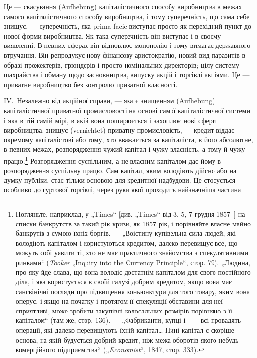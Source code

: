Це — скасування (Aufhebung) капіталістичного способу виробництва
в межах самого капіталістичного способу виробництва,
і тому суперечність, що сама себе знищує, — суперечність, яка
prima facie виступає просто як перехідний пункт до нової
форми виробництва. Як така суперечність він виступає і в
своєму виявленні. В певних сферах він відновлює монополію і
тому вимагає державного втручання. Він репродукує нову фінансову аристократію, новий вид паразитів в
образі прожектерів,
грюндерів і просто номінальних директорів; цілу систему шахрайства і обману щодо засновництва,
випуску акцій і торгівлі акціями.
Це — приватне виробництво без контролю приватної власності.

IV.~Незалежно від акційної справи, — яка є знищенням (Aufhebung) капіталістичної приватної
промисловості на основі самої
капіталістичної системи і яка в тій самій мірі, в якій вона поширюється і захоплює нові сфери
виробництва, знищує (vernichtet)
приватну промисловість, — кредит віддає окремому капіталістові
або тому, хто вважається за капіталіста, в його абсолютне, в
певних межах, розпорядження чужий капітал і чужу власність,
а тому й чужу працю.\footnote{
Погляньте, наприклад, у „Times“ [див. „Times“ від 3, 5, 7 грудня 1857~]
на списки банкрутств за такий рік кризи, як 1857 рік, і порівняйте власне майно
банкрутів з сумою їхніх боргів. — „Воістину купівельна сила людей, які володіють
капіталом і користуються кредитом, далеко перевищує все, що можуть собі уявити
ті, хто не має практичного знайомства з спекулятивними ринками“ (\emph{Tooker}
„Inquiry into the Currency Principle“, стор. 79). „Людина, про яку йде слава, що
вона володіє достатнім капіталом для свого постійного діла, і яка користується в своїй галузі добрим
кредитом, якщо вона має сангвінічні погляди
про підвищення коньюнктури для того товару, яким вона оперує, і якщо на
початку і протягом її спекуляції обставини для неї сприятливі, може зробити
закупівлі колосальних розмірів порівняно з її капіталом“ (там же, стор. 136). —
 „Фабриканти, купці і~ — всі провадять операції, які далеко перевищують їхній
капітал\dots{} Нині капітал є скоріше основа, на якій будується добрий кредит,
ніж межа оборотів якого-небудь комерційного підприємства“ („\emph{Economist}“, 1847,
стор. 333).
} Розпорядження суспільним, а не власним
капіталом дає йому в розпорядження суспільну працю. Сам капітал, яким володіють дійсно або на думку
публіки, стає тільки
основою для кредитної надбудови. Це стосується особливо до
гуртової торгівлі, через руки якої проходить найзначніша частина
